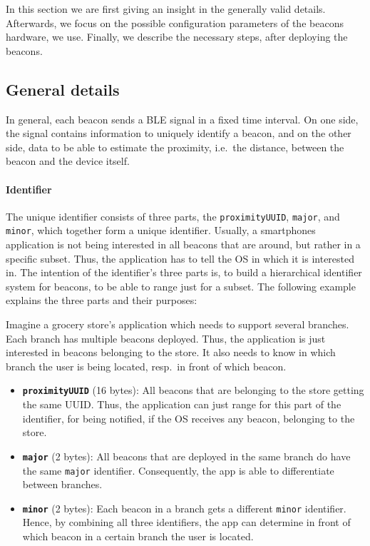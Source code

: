 In this section we are first giving an insight in the generally valid details. Afterwards, we focus on the possible configuration parameters of the beacons hardware, we use. Finally, we describe the necessary steps, after deploying the beacons.

\subsection{General details}
In general, each beacon sends a \acs{BLE} signal in a fixed time interval. On one side, the signal contains information to uniquely identify a beacon, and on the other side, data to be able to estimate the proximity, i.e.\ the distance, between the beacon and the device itself.

\paragraph{Identifier} The unique identifier consists of three parts, the \texttt{proximityUUID}, \texttt{major}, and \texttt{minor}, which together form a unique identifier. Usually, a smartphones application is not being interested in all beacons that are around, but rather in a specific subset. Thus, the application has to tell the \ac{OS} in which it is interested in. The intention of the identifier's three parts is, to build a hierarchical identifier system for beacons, to be able to range just for a subset. The following example explains the three parts and their purposes:

Imagine a grocery store's application which needs to support several branches. Each branch has multiple beacons deployed. Thus, the application is just interested in beacons belonging to the store. It also needs to know in which branch the user is being located, resp.\ in front of which beacon.

\begin{itemize}
  \item \textbf{\texttt{proximityUUID}} (16 bytes): All beacons that are belonging to the store getting the same \acl{UUID}. Thus, the application can just range for this part of the identifier, for being notified, if the \ac{OS} receives any beacon, belonging to the store.
  \item \textbf{\texttt{major}} (2 bytes): All beacons that are deployed in the same branch do have the same \texttt{major} identifier. Consequently, the app is able to differentiate between branches.
  \item \textbf{\texttt{minor}} (2 bytes): Each beacon in a branch gets a different \texttt{minor} identifier. Hence, by combining all three identifiers, the app can determine in front of which beacon in a certain branch the user is located.
\end{itemize}

